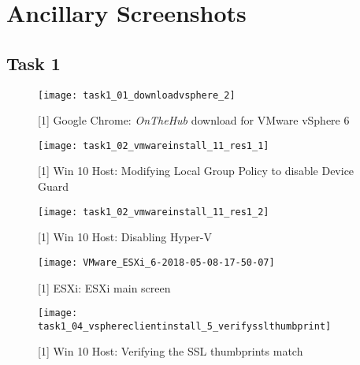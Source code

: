 \section{Ancillary Screenshots}
\label{app:ancillaryscreenshots}

\subsection{Task 1}

\begin{figure}[H]
  \centering
  \captionsetup{skip=2pt}
  \texttt{[image: task1\_01\_downloadvsphere\_2]}
  \caption{[1] Google Chrome: \textit{OnTheHub\textsuperscript{\textregistered}} download for VMware vSphere 6}
  \label{fig:task1:01_downloadvsphere}
\end{figure}

\begin{figure}[H]
  \centering
  \captionsetup{skip=2pt}
  \texttt{[image: task1\_02\_vmwareinstall\_11\_res1\_1]}
  \caption{[1] Win 10 Host: Modifying Local Group Policy to disable Device Guard}
  \label{fig:task1:02_vmware_11_res1}
\end{figure}

\begin{figure}[H]
  \centering
  \captionsetup{skip=2pt}
  \texttt{[image: task1\_02\_vmwareinstall\_11\_res1\_2]}
  \caption{[1] Win 10 Host: Disabling Hyper-V}
  \label{fig:task1:02_vmware_11_res2}
\end{figure}

\begin{figure}[H]
  \centering
  \captionsetup{skip=2pt}
  \texttt{[image: VMware\_ESXi\_6-2018-05-08-17-50-07]}
  \caption{[1] ESXi: ESXi main screen}
  \label{fig:task1:esxiinstall_up}
\end{figure}

\begin{figure}[H]
  \centering
  \captionsetup{skip=2pt}
  \texttt{[image: task1\_04\_vsphereclientinstall\_5\_verifysslthumbprint]}
  \caption{[1] Win 10 Host: Verifying the SSL thumbprints match}
  \label{fig:task1:vspheredesktopclient_03}
\end{figure}

